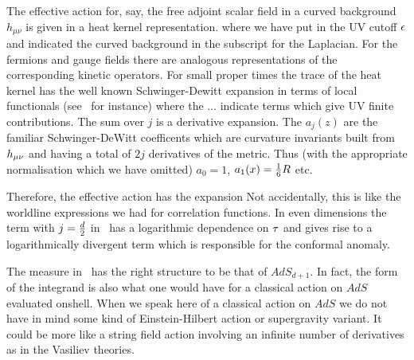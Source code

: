 
The effective action for, say, the free adjoint scalar field in a curved background $h_{\mu\nu}$
is given in a heat kernel representation. 
\eqn{}
where we have put in the UV cutoff ${\epsilon}$ and indicated the curved background in the 
subscript for the Laplacian. For the fermions and gauge fields there are analogous representations of the
corresponding kinetic operators. 
For small proper times the trace of the heat kernel has the well known Schwinger-Dewitt expansion in 
terms of local functionals (see \birdav\ for instance)
\eqn{}
where the $\ldots$ indicate terms which give UV finite contributions. The sum over $j$ is a derivative 
expansion. The $a_j(z)$ are the familiar Schwinger-DeWitt coefficents which are curvature
invariants built from $h_{{\mu}{\nu}}$ and having a total of $2j$ derivatives of the metric. 
Thus (with the appropriate normalisation which we have omitted) $a_0=1$, $a_1(x)={1\over 6}R$ etc.

Therefore, the effective action has the expansion
\eqn{}
Not accidentally, this is like the worldline expressions we had for correlation functions. 
In even dimensions the term with $j={d \over 2}$ in \dws\ has a logarithmic dependence on ${\tau}$ and 
gives rise to a logarithmically divergent term which is 
responsible for the conformal anomaly.


The measure in \effexp\ has the right structure to be that of $AdS_{d+1}$. In fact, the form of the 
integrand is also what one would have for a classical action on $AdS$ evaluated onshell. 
When we speak here of a classical action on $AdS$ we do not have in mind some kind of Einstein-Hilbert
action or supergravity variant. It could be more like a string field 
action involving an infinite number of derivatives as in
the Vasiliev theories. 

